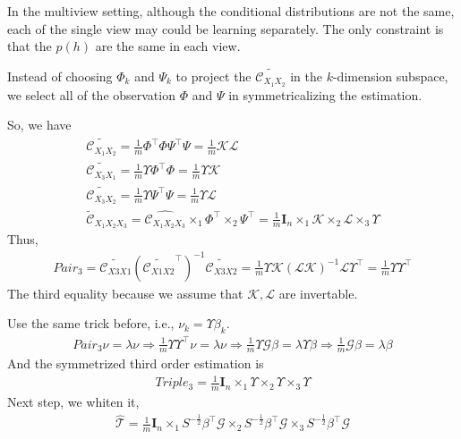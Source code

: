 \documentclass[11pt]{article}
\newcommand{\trans}{\top}
\newcommand{\bm}{\mathbf}
\begin{document}
In the multiview setting, although the conditional distributions are not the same, each of the single view may could be learning separately. The only constraint is that the $p(h)$ are the same in each view. 

Instead of choosing $\Phi_k$ and $\Psi_k$ to project the $\widetilde{\mathcal{C}_{X_1X_2}}$ in the $k$-dimension subspace, we select all of the observation $\Phi$ and $\Psi$ in symmetricalizing the estimation.

So, we have
%
\begin{eqnarray*}
\widetilde{\mathcal{C}_{X_1X_2}} = \frac{1}{m}\Phi^\trans\Phi\Psi^\trans \Psi = \frac{1}{m}\mathcal{K L}\\
\widetilde{\mathcal{C}_{X_3X_1}} = \frac{1}{m}\Upsilon\Phi^\trans \Phi = \frac{1}{m}\Upsilon\mathcal{K}\\
\widetilde{\mathcal{C}_{X_3X_2}} = \frac{1}{m}\Upsilon\Psi^\trans \Psi = \frac{1}{m}\Upsilon\mathcal{L}\\
\widetilde{\mathcal{C}}_{X_1X_2X_3} = \hat{\mathcal{C}_{X_1X_2X_3}}\times_1 \Phi^\trans \times_2 \Psi^\trans = \frac{1}{m}\bm{I}_n \times_1 \mathcal{K} \times_2 \mathcal{L} \times_3
\Upsilon
\end{eqnarray*}
%
Thus,
%
\begin{eqnarray*}
Pair_3 =
\widetilde{\mathcal{C}_{X3X1}}(\widetilde{\mathcal{C}_{X1X2}}^\trans)^{-1}\widetilde{\mathcal{C}_{X3X2}}
=
\frac{1}{m}\Upsilon\mathcal{K}(\mathcal{L}\mathcal{K})^{-1}\mathcal{L}\Upsilon^\trans = \frac{1}{m}\Upsilon\Upsilon^\trans
\end{eqnarray*}
%
The third equality because we assume that $\mathcal{K, L}$ are invertable. 

Use the same trick before, i.e., $\nu_k = \Upsilon \beta_k$.
%
\begin{eqnarray*}
Pair_3\nu = \lambda\nu \Rightarrow \frac{1}{m}\Upsilon\Upsilon^\trans\nu = \lambda \nu \Rightarrow \frac{1}{m}\Upsilon\mathcal{G}\beta = \lambda \Upsilon\beta \Rightarrow \frac{1}{m}\mathcal{G}\beta = \lambda\beta
\end{eqnarray*}
%
And the symmetrized third order estimation is 
%
\begin{eqnarray*}
Triple_3 = \frac{1}{m}\bm{I}_n \times_1 \Upsilon \times_2 \Upsilon \times_3 \Upsilon
\end{eqnarray*}
%
Next step, we whiten it,
%
\begin{eqnarray*}
\hat{\mathcal{T}} = \frac{1}{m}\bm{I}_n \times_1 S^{-\frac{1}{2}}\beta^\trans \mathcal{G}\times_2 S^{-\frac{1}{2}}\beta^\trans \mathcal{G}\times_3 S^{-\frac{1}{2}}\beta^\trans \mathcal{G}
\end{eqnarray*}
%
\end{document}
